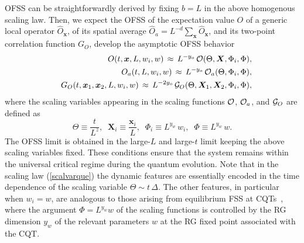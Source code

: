  
OFSS can be straightforwardly derived by fixing $b=L$ in the above
homogenous scaling law. Then, we expect the OFSS of the expectation
value $O$ of a generic local operator $\hat{O}_{\bm x}$, of its
spatial average $\hat{O}_a =L^{-d}\sum_{\bm x}\hat{O}_{\bm x}$, and
its two-point correlation function $G_O$, develop the asymptotic OFSS
behavior~\cite{pelissetto2017dynamic,rossini2021coherent}
\begin{eqnarray}
  && O(t, {\bm x}, L, w_i, w) \, \approx \, L^{-y_o} \,
  {\cal O}(\Theta, {\bm X}, \Phi_i, \Phi),
\nonumber\\
  && O_a(t, L, w_i, w) \, \approx \, L^{-y_o} \, {\cal O}_a(\Theta,
\Phi_i, \Phi),   \label{Oscaquefss}\\
  && G_{O}(t, {\bm x}_1, {\bm x}_2, L,
  w_i, w) \, \approx \, L^{-2y_o} \, {\cal G}_{O}(\Theta, {\bm X}_1,
  {\bm X}_2, \Phi_i, \Phi), \nonumber
\end{eqnarray}
where the scaling variables appearing in the scaling functions ${\cal
  O}$, ${\cal O}_a$, and ${\cal G}_O$ are defined as
\begin{equation}
  \Theta\equiv\frac{t}{L^z},\;\; {\bm X}_i \equiv \frac{{\bm x}_i}{L},\;\;
  \Phi_{i} \equiv
L^{y_w} \, w_i , \;\; \Phi \equiv L^{y_w} \,w.
  \label{scalvarque}
\end{equation}
The OFSS limit is obtained in the large-$L$ and large-$t$ limit
keeping the above scaling variables fixed. These conditions ensure
that the system remains within the universal critical regime during
the quantum evolution.  Note that in the scaling law
(\ref{scalvarque}) the dynamic features are essentially encoded in the
time dependence of the scaling variable $\Theta\sim t\,\Delta$.  The
other features, in particular when $w_i=w$, are analogous to those
arising from equilibrium FSS at CQTs~\cite{CV2014,rossini2021coherent}, where the
argument $\Phi=L^{y_w} w$ of the scaling functions is controlled by
the RG dimension $y_w$ of the relevant parameters $w$ at the RG fixed
point associated with the CQT.


